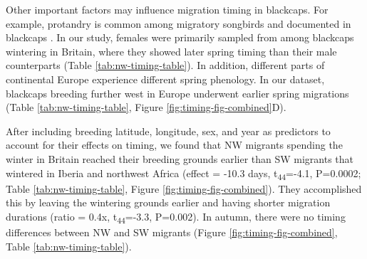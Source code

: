 \documentclass[a4paper, nobind]{templates/ociamthesis}
\begin{document}
Other important factors may influence migration timing in blackcaps.
For example, protandry is common among migratory songbirds and documented in blackcaps \autocite{rainioEffectsClimateChange2007}.
In our study, females were primarily sampled from among blackcaps wintering in Britain, where they showed later spring timing than their male counterparts (Table \ref{tab:nw-timing-table}).
In addition, different parts of continental Europe experience different spring phenology.
In our dataset, blackcaps breeding further west in Europe underwent earlier spring migrations (Table \ref{tab:nw-timing-table}, Figure \ref{fig:timing-fig-combined}D).

After including breeding latitude, longitude, sex, and year as predictors to account for their effects on timing, we found that NW migrants spending the winter in Britain reached their breeding grounds earlier than SW migrants that wintered in Iberia and northwest Africa (effect = -10.3 days, t\textsubscript{44}=-4.1, P=0.0002; Table \ref{tab:nw-timing-table}, Figure \ref{fig:timing-fig-combined}).
They accomplished this by leaving the wintering grounds earlier
\autocite[effect = -6.3 days, t\textsubscript{43}=-2.5, P=0.016; compare][]{terrillEcophysiologicalAspectsRapid1990} and having shorter migration durations (ratio = 0.4x, t\textsubscript{44}=-3.3, P=0.002).
In autumn, there were no timing differences between NW and SW migrants (Figure \ref{fig:timing-fig-combined}, Table \ref{tab:nw-timing-table}).
\end{document}
